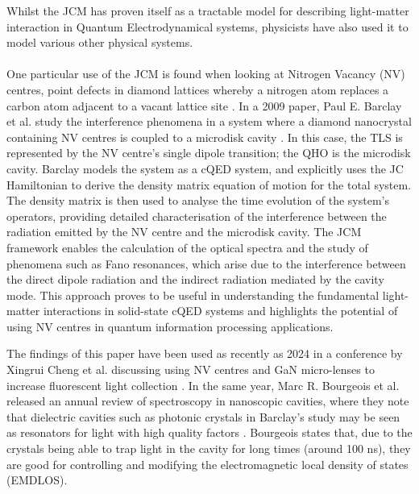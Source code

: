 \documentclass[12pt,a4paper]{article}
\begin{document}
Whilst the JCM has proven itself as a tractable model for describing light-matter interaction in Quantum Electrodynamical systems, physicists have also used it to model various other physical systems.\\
\\
One particular use of the JCM is found when looking at Nitrogen Vacancy (NV) centres, point defects in diamond lattices whereby a nitrogen atom replaces a carbon atom adjacent to a vacant lattice site \cite{General2024-JC_overview}. In a 2009 paper, Paul E. Barclay et al. study the interference phenomena in a system where a diamond nanocrystal containing NV centres is coupled to a microdisk cavity \cite{Context2009-Alt_NVcentres}. In this case, the TLS is represented by the NV centre's single dipole transition; the QHO is the microdisk cavity. Barclay models the system as a cQED system, and explicitly uses the JC Hamiltonian to derive the density matrix equation of motion for the total system. The density matrix is then used to analyse the time evolution of the system's operators, providing detailed characterisation of the interference between the radiation emitted by the NV centre and the microdisk cavity. The JCM framework enables the calculation of the optical spectra and the study of phenomena such as Fano resonances, which arise due to the interference between the direct dipole radiation and the indirect radiation mediated by the cavity mode. This approach proves to be useful in understanding the fundamental light-matter interactions in solid-state cQED systems and highlights the potential of using NV centres in quantum information processing applications. 

The findings of this paper have been used as recently as 2024 in a conference by Xingrui Cheng et al. discussing using NV centres and GaN micro-lenses to increase fluorescent light collection \cite{Context2024_NVcentre_conference}. In the same year, Marc R. Bourgeois et al. released an annual review of  spectroscopy in nanoscopic cavities, where they note that dielectric cavities such as photonic crystals in Barclay's study may be seen as resonators for light with high quality factors \cite{Context2024_NVcentre_review}. Bourgeois states that, due to the crystals being able to trap light in the cavity for long times (around 100 ns), they are good for controlling and modifying the electromagnetic local density of states (EMDLOS).\\
\\
\end{document}
